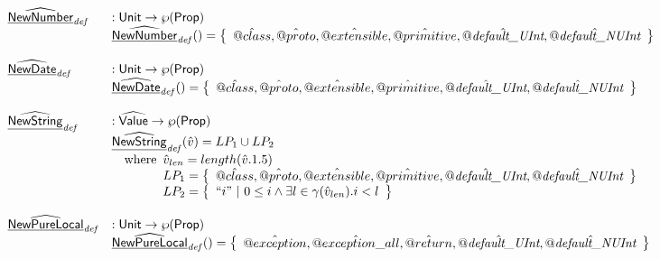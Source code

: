 \[\begin{array}{ll}
\widehat{\underline{\sf NewNumber}}_{\it def} & : \mbox{\textsf{Unit}} \rightarrow \wp(\mbox{\textsf{Prop}}) \\
& \widehat{\underline{\sf NewNumber}}_{\it def}() = \left\{\begin{array}{l}\hat{@class},\hat{@proto}, \hat{@extensible}, \hat{@primitive}, \hat{@\emph{default\_UInt}}, \hat{@\emph{default\_NUInt}}\end{array}\right\}
\\\\
\widehat{\underline{\sf NewDate}}_{\it def} & : \mbox{\textsf{Unit}} \rightarrow \wp(\mbox{\textsf{Prop}}) \\
& \widehat{\underline{\sf NewDate}}_{\it def}() = \left\{\begin{array}{l}\hat{@class},\hat{@proto}, \hat{@extensible}, \hat{@primitive}, \hat{@\emph{default\_UInt}}, \hat{@\emph{default\_NUInt}}\end{array}\right\}
\\\\
\widehat{\underline{\sf NewString}}_{\it def} & : \widehat{\mbox{\textsf{Value}}} \rightarrow \wp(\mbox{\textsf{Prop}}) \\
& \widehat{\underline{\sf NewString}}_{\it def}(\hat{v}) = LP_1\cup LP_2\\
& \quad{\rm where}\begin{array}[t]{l}
  \hat{v}_{len} = length(\hat{v}.1.5)\\
  LP_1 = \left\{\begin{array}{l}\hat{@class},\hat{@proto}, \hat{@extensible}, \hat{@primitive}, \hat{@\emph{default\_UInt}}, \hat{@\emph{default\_NUInt}}\end{array}\right\}\\
  LP_2 = \left\{\begin{array}{l}``i" ~|~ 0 \leq i \land \exists l\in\gamma(\hat{v}_{len}).i<l\end{array}\right\}
\end{array}
\\\\
\widehat{\underline{\sf NewPureLocal}}_{\it def} & : \mbox{\textsf{Unit}} \rightarrow \wp(\mbox{\textsf{Prop}}) \\
& \widehat{\underline{\sf NewPureLocal}}_{\it def}() = \left\{\begin{array}{l}\hat{@exception}, \hat{@exception\_all}, \hat{@return}, \hat{@\emph{default\_UInt}}, \hat{@\emph{default\_NUInt}}\end{array}\right\}
\end{array}
\]
